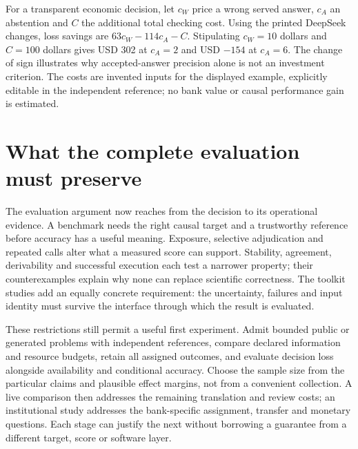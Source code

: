 For a transparent economic decision, let $c_W$ price a wrong served answer,
$c_A$ an abstention and $C$ the additional total checking cost. Using the
printed DeepSeek changes, loss savings are $63c_W-114c_A-C$. Stipulating
$c_W=10$ dollars and $C=100$ dollars gives USD 302 at $c_A=2$ and
USD $-154$ at $c_A=6$. The change of sign illustrates why accepted-answer
precision alone is not an investment criterion. The costs are invented
inputs for the displayed example, explicitly editable in the independent
reference; no bank value or causal performance gain is estimated.
\citep{exec23_controlled_writes_reference}

\section{What the complete evaluation must preserve}

The evaluation argument now reaches from the decision to its operational evidence. A benchmark needs the right causal target and a trustworthy reference before accuracy has a useful meaning. Exposure, selective adjudication and repeated calls alter what a measured score can support. Stability, agreement, derivability and successful execution each test a narrower property; their counterexamples explain why none can replace scientific correctness. The toolkit studies add an equally concrete requirement: the uncertainty, failures and input identity must survive the interface through which the result is evaluated.

These restrictions still permit a useful first experiment. Admit bounded public or generated problems with independent references, compare declared information and resource budgets, retain all assigned outcomes, and evaluate decision loss alongside availability and conditional accuracy. Choose the sample size from the particular claims and plausible effect margins, not from a convenient collection. A live comparison then addresses the remaining translation and review costs; an institutional study addresses the bank-specific assignment, transfer and monetary questions. Each stage can justify the next without borrowing a guarantee from a different target, score or software layer.
